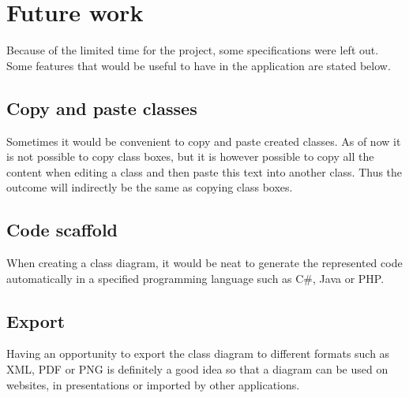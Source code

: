 \section{Future work}
\label{sec:future_work}

Because of the limited time for the project, some specifications were left out. Some features that would be useful to have in the application are stated below.

\subsection{Copy and paste classes}

Sometimes it would be convenient to copy and paste created classes. As of now it is not possible to copy class boxes, but it is however possible to copy all the content when editing a class and then paste this text into another class. Thus the outcome will indirectly be the same as copying class boxes.

\subsection{Code scaffold}

When creating a class diagram, it would be neat to generate the represented code automatically in a specified programming language such as C#, Java or PHP. 

\subsection{Export}

Having an opportunity to export the class diagram to different formats such as XML, PDF or PNG is definitely a good idea so that a diagram can be used on websites, in presentations or imported by other applications.